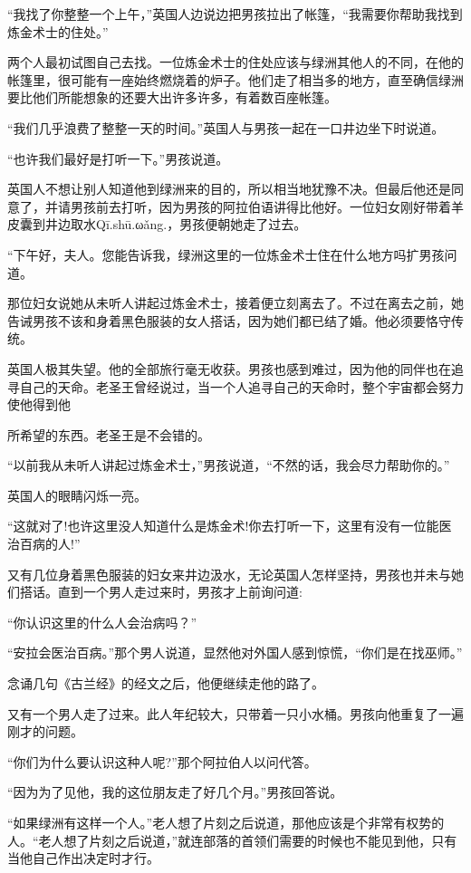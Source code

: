 \documentclass[twoside,openany]{book}
\begin{document}
“我找了你整整一个上午，”英国人边说边把男孩拉出了帐篷，“我需要你帮助我找到炼金术士的住处。”

两个人最初试图自己去找。一位炼金术士的住处应该与绿洲其他人的不同，在他的帐篷里，很可能有一座始终燃烧着的炉子。他们走了相当多的地方，直至确信绿洲要比他们所能想象的还要大出许多许多，有着数百座帐篷。

“我们几乎浪费了整整一天的时间。”英国人与男孩一起在一口井边坐下时说道。

“也许我们最好是打听一下。”男孩说道。

英国人不想让别人知道他到绿洲来的目的，所以相当地犹豫不决。但最后他还是同意了，并请男孩前去打听，因为男孩的阿拉伯语讲得比他好。一位妇女刚好带着羊皮囊到井边取水Qī.shū.ωǎng.，男孩便朝她走了过去。

“下午好，夫人。您能告诉我，绿洲这里的一位炼金术士住在什么地方吗扩男孩问道。

那位妇女说她从未听人讲起过炼金术士，接着便立刻离去了。不过在离去之前，她告诫男孩不该和身着黑色服装的女人搭话，因为她们都已结了婚。他必须要恪守传统。

英国人极其失望。他的全部旅行毫无收获。男孩也感到难过，因为他的同伴也在追寻自己的天命。老圣王曾经说过，当一个人追寻自己的天命时，整个宇宙都会努力使他得到他

所希望的东西。老圣王是不会错的。

“以前我从未听人讲起过炼金术士，”男孩说道，“不然的话，我会尽力帮助你的。”

英国人的眼睛闪烁一亮。

“这就对了!也许这里没人知道什么是炼金术!你去打听一下，这里有没有一位能医治百病的人!”

又有几位身着黑色服装的妇女来井边汲水，无论英国人怎样坚持，男孩也并未与她们搭话。直到一个男人走过来时，男孩才上前询问道:

“你认识这里的什么人会治病吗？”

“安拉会医治百病。”那个男人说道，显然他对外国人感到惊慌，“你们是在找巫师。”

念诵几句《古兰经》的经文之后，他便继续走他的路了。

又有一个男人走了过来。此人年纪较大，只带着一只小水桶。男孩向他重复了一遍刚才的问题。

“你们为什么要认识这种人呢?”那个阿拉伯人以问代答。

“因为为了见他，我的这位朋友走了好几个月。”男孩回答说。

“如果绿洲有这样一个人。”老人想了片刻之后说道，那他应该是个非常有权势的人。“老人想了片刻之后说道，”就连部落的首领们需要的时候也不能见到他，只有当他自己作出决定时才行。
\end{document}
